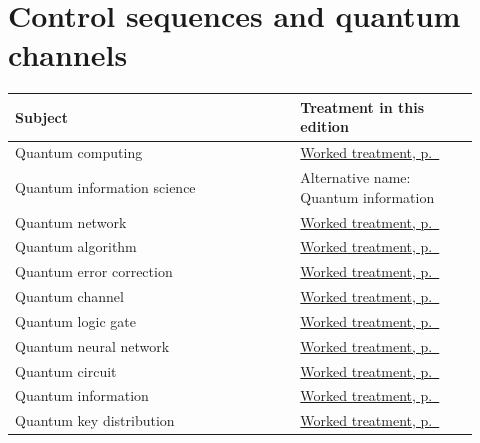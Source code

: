 \documentclass[11pt,oneside]{book}
\begin{document}
\section*{Control sequences and quantum channels}
\begin{longtable}{p{0.57\linewidth}p{0.35\linewidth}}
\toprule Subject & Treatment in this edition \\
\midrule\endhead
{}\label{index:quantum-computing}Quantum computing & \hyperref[topic:quantum-computing]{Worked treatment, p.~\pageref*{topic:quantum-computing}} \\
\label{index:quantum-information-science}Quantum information science & Alternative name: Quantum information \\
\label{index:quantum-network}Quantum network & \hyperref[topic:quantum-network]{Worked treatment, p.~\pageref*{topic:quantum-network}} \\
\label{index:quantum-algorithm}Quantum algorithm & \hyperref[topic:quantum-algorithm]{Worked treatment, p.~\pageref*{topic:quantum-algorithm}} \\
\label{index:quantum-error-correction}Quantum error correction & \hyperref[topic:quantum-error-correction]{Worked treatment, p.~\pageref*{topic:quantum-error-correction}} \\
\label{index:quantum-channel}Quantum channel & \hyperref[topic:quantum-channel]{Worked treatment, p.~\pageref*{topic:quantum-channel}} \\
\label{index:quantum-logic-gate}Quantum logic gate & \hyperref[topic:quantum-logic-gate]{Worked treatment, p.~\pageref*{topic:quantum-logic-gate}} \\
\label{index:quantum-neural-network}Quantum neural network & \hyperref[topic:quantum-neural-network]{Worked treatment, p.~\pageref*{topic:quantum-neural-network}} \\
\label{index:quantum-circuit}Quantum circuit & \hyperref[topic:quantum-circuit]{Worked treatment, p.~\pageref*{topic:quantum-circuit}} \\
\label{index:quantum-information}Quantum information & \hyperref[topic:quantum-information]{Worked treatment, p.~\pageref*{topic:quantum-information}} \\
\label{index:quantum-key-distribution}Quantum key distribution & \hyperref[topic:quantum-key-distribution]{Worked treatment, p.~\pageref*{topic:quantum-key-distribution}} \\

\end{longtable}
\end{document}
